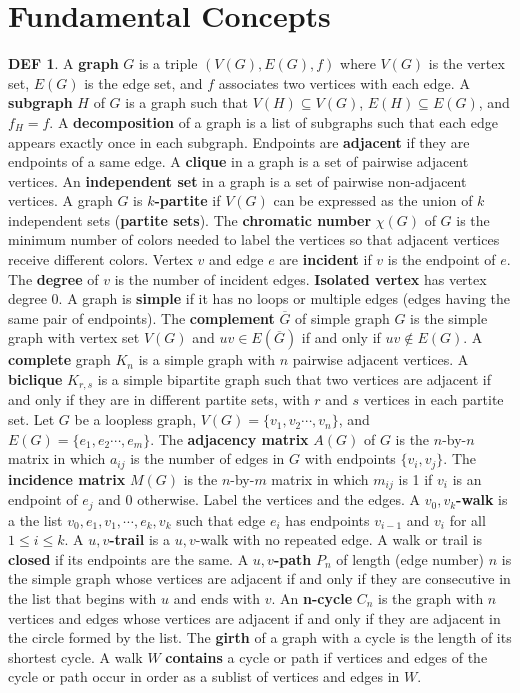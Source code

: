 \documentclass[11pt]{article}
\theoremstyle{definition}
\newtheorem*{defin}{DEF}
\theoremstyle{dotles}
\theoremstyle{dotless}
\theoremstyle{remark}
\begin{document}
\section{Fundamental Concepts}

\begin{defin}
A \textbf{graph} $G$ is a triple $(V(G),E(G),f)$ where $V(G)$ is the vertex set, $E(G)$ is the edge set, and $f$ associates two vertices with each edge. A \textbf{subgraph} $H$ of $G$ is a graph such that $V(H)\subseteq V(G)$, $E(H)\subseteq E(G)$, and $f_H=f$. A \textbf{decomposition} of a graph is a list of subgraphs such that each edge appears exactly once in each subgraph.\medbreak
Endpoints are \textbf{adjacent} if they are endpoints of a same edge. A \textbf{clique} in a graph is a set of pairwise adjacent vertices. An \textbf{independent set} in a graph is a set of pairwise non-adjacent vertices. A graph $G$ is \textbf{$k$-partite} if $V(G)$ can be expressed as the union of $k$ independent sets (\textbf{partite sets}). The \textbf{chromatic number} $\chi(G)$ of $G$ is the minimum number of colors needed to label the vertices so that adjacent vertices receive different colors. Vertex $v$ and edge $e$ are \textbf{incident} if $v$ is the endpoint of $e$. The \textbf{degree} of $v$ is the number of incident edges. \textbf{Isolated vertex} has vertex degree 0.\medbreak
A graph is \textbf{simple} if it has no loops or multiple edges (edges having the same pair of endpoints). The \textbf{complement} $\overline{G}$ of simple graph $G$ is the simple graph with vertex set $V(G)$ and $uv\in E(\overline{G})$ if and only if $uv\not\in E(G)$. A \textbf{complete} graph $K_n$ is a simple graph with $n$ pairwise adjacent vertices. A \textbf{biclique} $K_{r,s}$ is a simple bipartite graph such that two vertices are adjacent if and only if they are in different partite sets, with $r$ and $s$ vertices in each partite set.\medbreak
Let $G$ be a loopless graph, $V(G)=\{v_1,v_2\cdots,v_n\}$, and $E(G)=\{e_1,e_2\cdots,e_m\}$. The \textbf{adjacency matrix} $A(G)$ of $G$ is the $n$-by-$n$ matrix in which $a_{ij}$ is the number of edges in $G$ with endpoints $\{v_i,v_j\}$. The \textbf{incidence matrix} $M(G)$ is the $n$-by-$m$ matrix in which $m_{ij}$ is 1 if $v_i$ is an endpoint of $e_j$ and 0 otherwise.\medbreak
Label the vertices and the edges. A \textbf{$v_0,v_k$-walk} is a the list $v_0,e_1,v_1,\cdots,e_k,v_k$ such that edge $e_i$ has endpoints $v_{i-1}$ and $v_i$ for all $1\leq i\leq k$. A \textbf{$u,v$-trail} is a $u,v$-walk with no repeated edge. A walk or trail is \textbf{closed} if its endpoints are the same. A \textbf{$u,v$-path} $P_n$ of length (edge number) $n$ is the simple graph whose vertices are adjacent if and only if they are consecutive in the list that begins with $u$ and ends with $v$. An \textbf{n-cycle} $C_n$ is the graph with $n$ vertices and edges whose vertices are adjacent if and only if they are adjacent in the circle formed by the list. The \textbf{girth} of a graph with a cycle is the length of its shortest cycle. A walk $W$ \textbf{contains} a cycle or path if vertices and edges of the cycle or path occur in order as a sublist of vertices and edges in $W$.
\end{defin}
\end{document}
